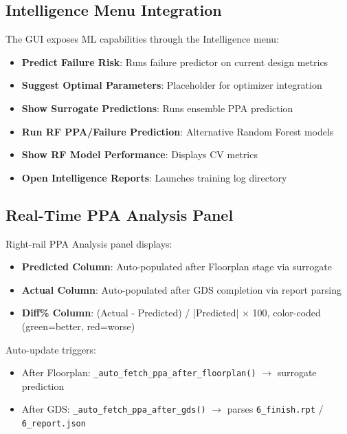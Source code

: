 \documentclass[10pt,conference]{IEEEtran}
\begin{document}
\subsection{Intelligence Menu Integration}

The GUI exposes ML capabilities through the Intelligence menu:
\begin{itemize}
    \item \textbf{Predict Failure Risk}: Runs failure predictor on current design metrics
    \item \textbf{Suggest Optimal Parameters}: Placeholder for optimizer integration
    \item \textbf{Show Surrogate Predictions}: Runs ensemble PPA prediction
    \item \textbf{Run RF PPA/Failure Prediction}: Alternative Random Forest models
    \item \textbf{Show RF Model Performance}: Displays CV metrics
    \item \textbf{Open Intelligence Reports}: Launches training log directory
\end{itemize}

\subsection{Real-Time PPA Analysis Panel}

Right-rail PPA Analysis panel displays:
\begin{itemize}
    \item \textbf{Predicted Column}: Auto-populated after Floorplan stage via surrogate
    \item \textbf{Actual Column}: Auto-populated after GDS completion via report parsing
    \item \textbf{Diff\% Column}: (Actual - Predicted) / |Predicted| $\times$ 100, color-coded (green=better, red=worse)
\end{itemize}

Auto-update triggers:
\begin{itemize}
    \item After Floorplan: \texttt{\_auto\_fetch\_ppa\_after\_floorplan()} $\rightarrow$ surrogate prediction
    \item After GDS: \texttt{\_auto\_fetch\_ppa\_after\_gds()} $\rightarrow$ parses \texttt{6\_finish.rpt} / \texttt{6\_report.json}
\end{itemize}
\end{document}
